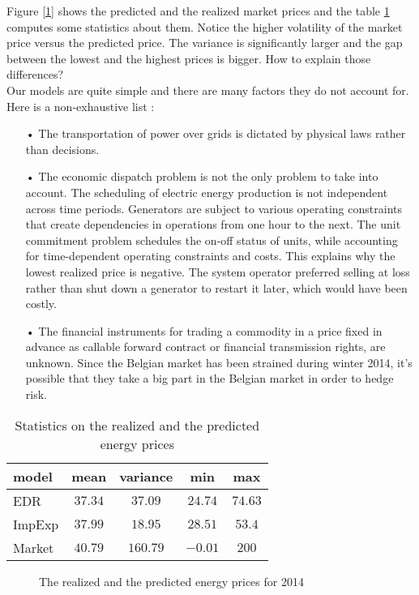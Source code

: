 
Figure [\ref{fig:EDR_IMPEXP}] shows the predicted and the realized market prices and the table \ref{tab1} computes some statistics about them. Notice the higher volatility of the market price versus the predicted price. The variance is significantly larger and the gap between the lowest and the highest prices is bigger. How to explain those differences? \\

Our models are quite simple and there are many factors they do not account for. Here is a non-exhaustive list :

\begin{itemize}
\item[•] The transportation of power over grids is dictated by physical laws rather than decisions.
\item[•] The economic dispatch problem is not the only problem to take into account. The scheduling of electric energy production is not independent across time periods. Generators are subject to various operating constraints that create dependencies in operations from one hour to the next. The unit commitment problem schedules the on-off status of units, while accounting for time-dependent operating constraints and costs. This explains why the lowest realized price is negative. The system operator preferred selling at loss rather than shut down a generator to restart it later, which would have been costly.
\item[•] The financial instruments for trading a commodity in a price fixed in advance as callable forward contract or financial transmission rights, are unknown. Since the Belgian market has been strained during winter 2014, it's possible that they take a big part in the Belgian market in order to hedge risk.
\end{itemize}

\begin{table}[H]
\centering
\begin{tabular}{l | c  c  c  c}
model & mean & variance & min & max \\
\hline
EDR & $37.34$ &  $37.09$ & $24.74$ &  $74.63$ \\
ImpExp & $37.99$ &  $18.95$ & $28.51$ &  $53.4$ \\
\hline
Market & $40.79$ &  $160.79$ & $ -0.01$ &  $200$ \\
\end{tabular}
\caption{Statistics on the realized and the predicted energy prices}
\label{tab1}
\end{table}

\begin{figure}[H]
    \centering
    \setlength{}
    \setlength{}
    
    \caption{The realized and the predicted energy prices for 2014}
    \label{fig:EDR_IMPEXP}
\end{figure}